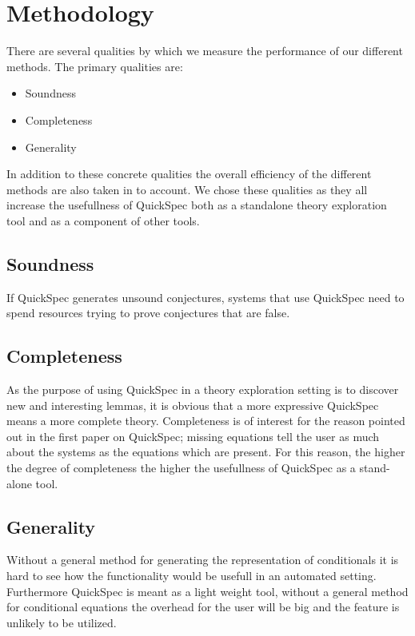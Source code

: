 \section{Methodology}
There are several qualities by which we measure the performance of our different methods.
The primary qualities are:

\begin{itemize}

    \item Soundness
    \item Completeness
    \item Generality

\end{itemize}

In addition to these concrete qualities the overall efficiency of the different methods are also
taken in to account.
We chose these qualities as they all increase the usefullness
of QuickSpec both as a standalone theory exploration tool
and as a component of other tools.

    \subsection{Soundness}
    If QuickSpec generates unsound conjectures, systems that use QuickSpec
    need to spend resources trying to prove conjectures that are false. 

    \subsection{Completeness}
    As the purpose of using QuickSpec in a theory exploration setting is to discover
    new and interesting lemmas, it is obvious that a more expressive QuickSpec means a more
    complete theory. %
    Completeness is of interest for the reason pointed out in the first paper on QuickSpec; %
    missing equations tell the user as much about the systems as the equations which are
    present. For this reason, the higher the degree of completeness the higher the usefullness
    of QuickSpec as a stand-alone tool. 

    \subsection{Generality}
    Without a general method for generating the representation of conditionals
    it is hard to see how the functionality would be usefull in an automated setting.
    Furthermore QuickSpec is meant as a light weight tool, without a general method
    for conditional equations the overhead for the user will be big and the feature
    is unlikely to be utilized.
